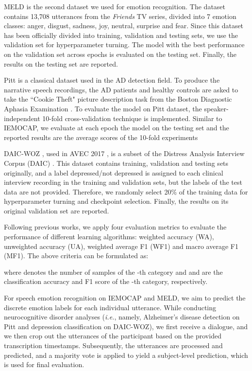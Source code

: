\documentclass[lettersize,journal]{IEEEtran}
\begin{document}
MELD \cite{meld} is the second dataset we used for emotion recognition. The dataset contains 13,708 utterances from the \textit{Friends} TV series, divided into 7 emotion classes: anger, disgust, sadness, joy, neutral, surprise and fear. Since this dataset has been officially divided into training, validation and testing sets, we use the validation set for hyperparameter turning. The model with the best performance on the validation set across epochs is evaluated on the testing set. Finally, the results on the testing set are reported.

Pitt \cite{pitt} is a classical dataset used in the AD detection field. To produce the narrative speech recordings, the AD patients and healthy controls are asked to take the ``Cookie Theft" picture description task from the Boston Diagnostic Aphasia Examination \cite{cookie}. To evaluate the model on Pitt dataset, the speaker-independent 10-fold cross-validation technique is implemented. Similar to IEMOCAP, we evaluate at each epoch the model on the testing set and the reported results are the average scores of the 10-fold experiments

DAIC-WOZ \cite{avec}, used in AVEC 2017 \cite{avec2017}, is a subset of the Distress Analysis Interview Corpus (DAIC) \cite{avec}. This dataset contains training, validation and testing sets originally, and a label depressed/not depressed is assigned to each clinical interview recording in the training and validation sets, but the labels of the test data are not provided. Therefore, we randomly select 20\% of the training data for hyperparameter turning and checkpoint selection. Finally, the results on its original validation set are reported.

Following previous works\cite{ctnet, Monica}, we apply four evaluation metrics to evaluate the performance of different learning algorithms: weighted accuracy (WA), unweighted accuracy (UA), weighted average F1 (WF1) and macro average F1 (MF1). The above criteria can be formulated as:

where  denotes the number of samples of the -th category and  and  are the classification accuracy and F1 score of the -th category, respectively.

For speech emotion recognition on IEMOCAP and MELD, we aim to predict the discrete emotion labels for each individual utterance. While conducting neurocognitive disorder analyses (\textit{i.e.}, namely, Alzheimer's disease detection on Pitt and depression classification on DAIC-WOZ), we first receive a dialogue, and we then crop out the utterances of the participant based on the provided transcription timestamps. Subsequently, the utterances are processed and predicted, and a majority vote is applied to yield a subject-level prediction, which is used for final evaluation.
\end{document}
